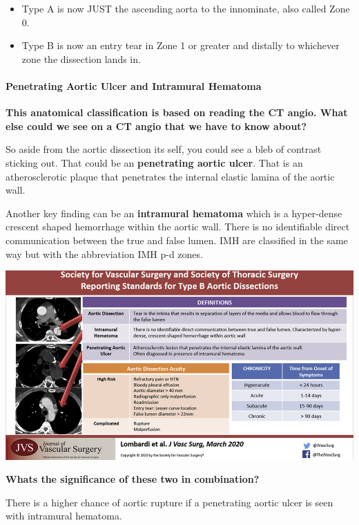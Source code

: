 \documentclass[
]{book}
\begin{document}
\begin{itemize}
\item
  Type A is now JUST the ascending aorta to the innominate, also
  called Zone 0.
\item
  Type B is now an entry tear in Zone 1 or greater and distally to
  whichever zone the dissection lands in.
\end{itemize}

\hypertarget{penetrating-aortic-ulcer-and-intramural-hematoma}{%
\paragraph{Penetrating Aortic Ulcer and Intramural Hematoma}\label{penetrating-aortic-ulcer-and-intramural-hematoma}}

\textbf{This anatomical classification is based on reading the CT angio. What
else could we see on a CT angio that we have to know about?}

So aside from the aortic dissection its self, you could see a bleb of
contrast sticking out. That could be an \textbf{penetrating aortic ulcer}.
That is an atherosclerotic plaque that penetrates the internal elastic
lamina of the aortic wall.\citep{ciccone2016}

Another key finding can be an \textbf{intramural hematoma} which is a
hyper-dense crescent shaped hemorrhage within the aortic wall. There is
no identifiable direct communication between the true and false lumen.
IMH are classified in the same way but with the abbreviation IMH p-d
zones.

\includegraphics[width=13.06in]{images/thoracic_dissection2}

\textbf{Whats the significance of these two in combination?}

There is a higher chance of aortic rupture if a penetrating aortic ulcer
is seen with intramural hematoma.
\end{document}
